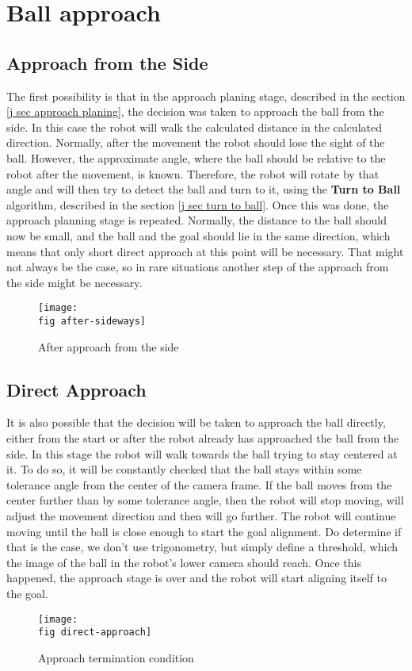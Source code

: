 \section{Ball approach}

\subsection{Approach from the Side}

The first possibility is that in the approach planing stage, described in the
section \ref{j sec approach planing}, the decision was taken to approach the
ball from the side. In this case the robot will walk the calculated distance in
the calculated direction. Normally, after the movement the robot should lose
the sight of the ball. However, the approximate angle, where the ball should be
relative to the robot after the movement, is known. Therefore, the robot will
rotate by that angle and will then try to detect the ball and turn to it, using
the \textbf{Turn to Ball} algorithm, described in the section \ref {j sec turn
  to ball}. Once this was done, the approach planning stage is repeated.
Normally, the distance to the ball should now be small, and the ball and the
goal should lie in the same direction, which means that only short direct
approach at this point will be necessary. That might not always be the case, so
in rare situations another step of the approach from the side might be
necessary.

\begin{figure}[ht]
  \texttt{[image: \\fig after-sideways]}
  \caption{After approach from the side}
  \label{p figure after-sideways}
\end{figure}

\subsection{Direct Approach}

It is also possible that the decision will be taken to approach the ball
directly, either from the start or after the robot already has approached the
ball from the side. In this stage the robot will walk towards the ball trying
to stay centered at it. To do so, it will be constantly checked that the ball
stays within some tolerance angle from the center of the camera frame. If the
ball moves from the center further than by some tolerance angle, then the robot
will stop moving, will adjust the movement direction and then will go further.
The robot will continue moving until the ball is close enough to start the goal
alignment. Do determine if that is the case, we don't use trigonometry, but
simply define a threshold, which the image of the ball in the robot's lower
camera should reach. Once this happened, the approach stage is over and the
robot will start aligning itself to the goal.

\begin{figure}[ht]
  \texttt{[image: \\fig direct-approach]}
  \caption{Approach termination condition}
  \label{p figure direct-approach}
\end{figure}
